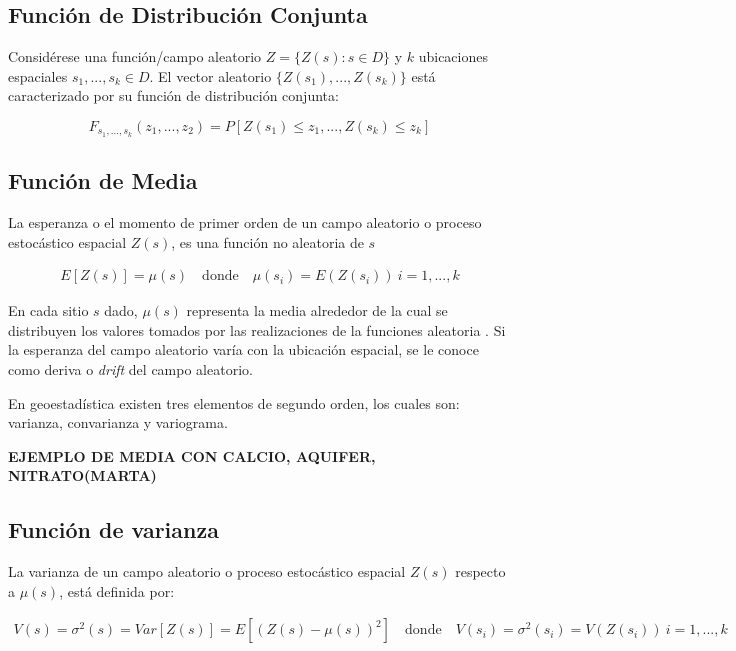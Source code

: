 \documentclass[
]{book}
\begin{document}
\hypertarget{funciuxf3n-de-distribuciuxf3n-conjunta}{%
\subsection{Función de Distribución Conjunta}\label{funciuxf3n-de-distribuciuxf3n-conjunta}}

Considérese una función/campo aleatorio \(Z=\{Z(s):s\in D\}\) y \(k\) ubicaciones espaciales \(s_1,...,s_k \in D\). El vector aleatorio \(\{Z(s_1),...,Z(s_k)\}\) está caracterizado por su función de distribución conjunta:

\[F_{s_1,...,s_k}(z_1,...,z_2)=P[Z(s_1)\leq z_1,...,Z(s_k)\leq z_k]\]

\hypertarget{funciuxf3n-de-media}{%
\subsection{Función de Media}\label{funciuxf3n-de-media}}

La esperanza o el momento de primer orden de un campo aleatorio o proceso estocástico espacial \(Z(s)\), es una función no aleatoria de \(s\)

\begin{align*}
E[Z(s)]=\mu(s)\quad\text{donde}\quad \mu(s_i)=E(Z(s_i))\ i=1,...,k    
\end{align*}

En cada sitio \(s\) dado, \(\mu(s)\) representa la media alrededor de la cual se distribuyen los valores tomados por las realizaciones de la funciones aleatoria \citep{Ramon}. Si la esperanza del campo aleatorio varía con la ubicación espacial, se le conoce como deriva o \emph{drift} del campo aleatorio.

En geoestadística existen tres elementos de segundo orden, los cuales son: varianza, convarianza y variograma.

\textbf{EJEMPLO DE MEDIA CON CALCIO, AQUIFER, NITRATO(MARTA)}

\hypertarget{funciuxf3n-de-varianza}{%
\subsection{Función de varianza}\label{funciuxf3n-de-varianza}}

La varianza de un campo aleatorio o proceso estocástico espacial \(Z(s)\) respecto a \(\mu(s)\), está definida por:

\begin{align*}
  V(s)=\sigma^2(s)=Var[Z(s)]=E[(Z(s)-\mu(s))^2]\quad \text{donde} \quad V(s_i)=\sigma^2(s_i)=V(Z(s_i))\ i=1,...,k
\end{align*}
\end{document}
